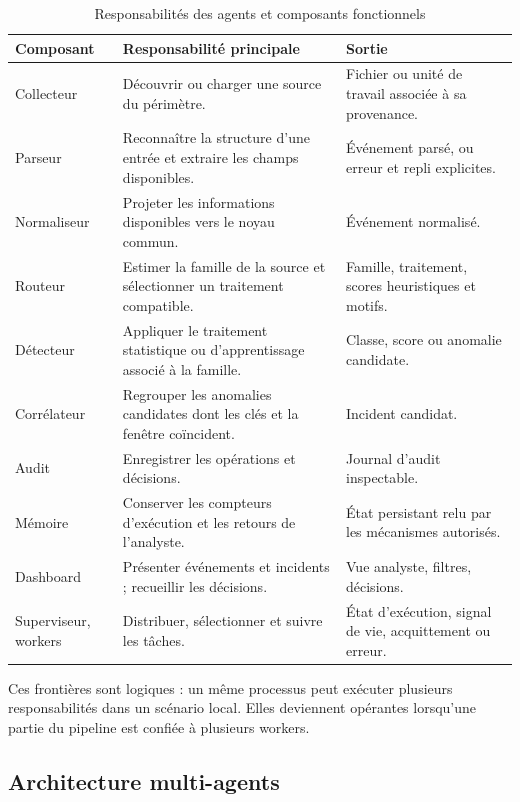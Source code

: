 \begin{table}[H]
\centering
\caption{Responsabilités des agents et composants fonctionnels}
\label{tab:agents-architecture}
\small
\begin{tabularx}{\textwidth}{p{3.0cm}X X}
\toprule
\textbf{Composant} & \textbf{Responsabilité principale} & \textbf{Sortie} \\
\midrule
Collecteur & Découvrir ou charger une source du périmètre. & Fichier ou unité de travail associée à sa provenance. \\
Parseur & Reconnaître la structure d'une entrée et extraire les champs disponibles. & Événement parsé, ou erreur et repli explicites. \\
Normaliseur & Projeter les informations disponibles vers le noyau commun. & Événement normalisé. \\
Routeur & Estimer la famille de la source et sélectionner un traitement compatible. & Famille, traitement, scores heuristiques et motifs. \\
Détecteur & Appliquer le traitement statistique ou d'apprentissage associé à la famille. & Classe, score ou anomalie candidate. \\
Corrélateur & Regrouper les anomalies candidates dont les clés et la fenêtre coïncident. & Incident candidat. \\
Audit & Enregistrer les opérations et décisions. & Journal d'audit inspectable. \\
Mémoire & Conserver les compteurs d'exécution et les retours de l'analyste. & État persistant relu par les mécanismes autorisés. \\
Dashboard & Présenter événements et incidents ; recueillir les décisions. & Vue analyste, filtres, décisions. \\
Superviseur, workers & Distribuer, sélectionner et suivre les tâches. & État d'exécution, signal de vie, acquittement ou erreur. \\
\bottomrule
\end{tabularx}
\end{table}

Ces frontières sont logiques : un même processus peut exécuter plusieurs responsabilités dans un scénario local. Elles deviennent opérantes lorsqu'une partie du pipeline est confiée à plusieurs workers.

\subsection{Architecture multi-agents}

